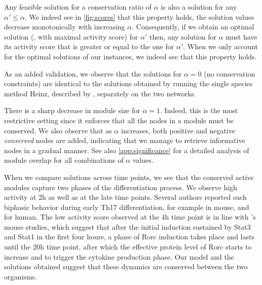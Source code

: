 Any feasible solution for a conservation ratio of $\alpha$ is also a solution for any $\alpha' \leq \alpha$.
We indeed see in \cref{fig:scores} that this property holds, the solution values decrease monotonically with increasing $\alpha$.
Consequently, if we obtain an optimal solution (\ie, with maximal activity score) for $\alpha'$ then, any solution for $\alpha$ must have its activity score that is greater or equal to the one for $\alpha'$.
When we only account for the optimal solutions of our instances, we indeed see that this property holds.

As an added validation, we observe that the solutions for $\alpha=0$ (no conservation constraints) are identical to the solutions obtained by running the single species method Heinz, described by \textcite{dittrich2008identifying}, separately on the two networks.

There is a sharp decrease in module size for $\alpha = 1$.
Indeed, this is the most restrictive setting since it enforces that all the nodes in a module must be conserved.
We also observe that as $\alpha$ increases, both positive and negative \emph{conserved} nodes are added, indicating that we manage to retrieve informative nodes in a gradual manner.
See also \cref{app:significance} for a detailed analysis of module overlap for all combinations of $\alpha$ values.

When we compare solutions across time points, we see that the conserved active modules capture two phases of the differentiation process.
We observe high activity at \unit{2}{h} as well as at the late time points.
Several authors reported such biphasic behavior during early Th17 differentiation, for example \textcites{ciofani2012validated}{yosef2013dynamic} in mouse, and \textcite{tuomela2012identification} for human.
The low activity score observed at the \unit{4}{h} time point is in line with \textcite{yosef2013dynamic}'s mouse studies, which suggest that after the initial induction sustained by Stat3 and Stat1 in the first four hours, a phase of Rorc induction takes place and lasts until the \unit{20}{h} time point, after which the effective protein level of Rorc starts to increase and to trigger the cytokine production phase.
Our model and the solutions obtained suggest that these dynamics are conserved between the two organisms.

